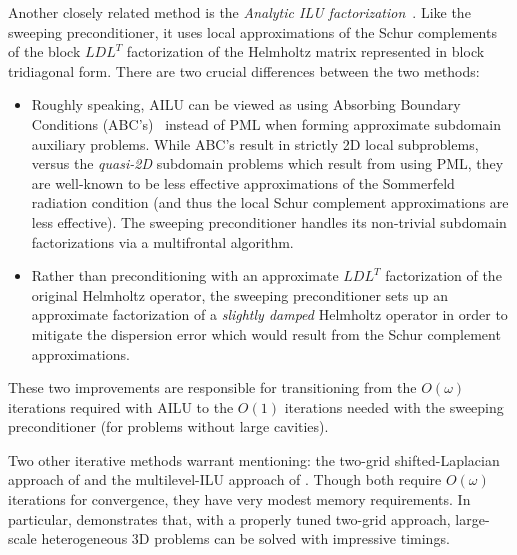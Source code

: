 Another closely related method is the 
{\em Analytic ILU factorization}~\cite{GanderNataf-AILU}. 
Like the sweeping preconditioner, it uses local approximations of the Schur 
complements of the block $LDL^T$ factorization of the Helmholtz matrix 
represented in block tridiagonal form.
There are two crucial differences between the two methods:
\begin{itemize}
\item Roughly speaking, AILU can be viewed as using Absorbing Boundary 
      Conditions (ABC's)~\cite{EngquistMajda-ABC} instead of PML when forming 
      approximate subdomain auxiliary problems. 
      While ABC's result in strictly 2D local subproblems,
      versus the {\em quasi-2D} subdomain problems which result from using PML, 
      they are well-known to be less effective approximations of the Sommerfeld
      radiation condition (and thus the local Schur complement approximations 
      are less effective). The sweeping preconditioner handles its non-trivial
      subdomain factorizations via a multifrontal algorithm.
\item Rather than preconditioning with an approximate $LDL^T$ factorization
      of the original Helmholtz operator, the sweeping preconditioner sets up
      an approximate factorization of a {\em slightly damped} Helmholtz operator
      in order to mitigate the dispersion error which would result from the 
      Schur complement approximations.
\end{itemize}
These two improvements are responsible for transitioning from the $O(\omega)$ 
iterations required with AILU to the $O(1)$ iterations needed with the 
sweeping preconditioner (for problems without large cavities). 

Two other iterative methods warrant mentioning: the two-grid shifted-Laplacian 
approach of \cite{Calandra-twogrid} and the multilevel-ILU approach of 
\cite{BollhoeferGroteSchenk-ILU}. Though both require $O(\omega)$ iterations 
for convergence, they have very modest memory requirements.
In particular, \cite{Calandra-twogrid} demonstrates that, with a properly 
tuned two-grid approach, large-scale heterogeneous 3D problems can be solved 
with impressive timings.


